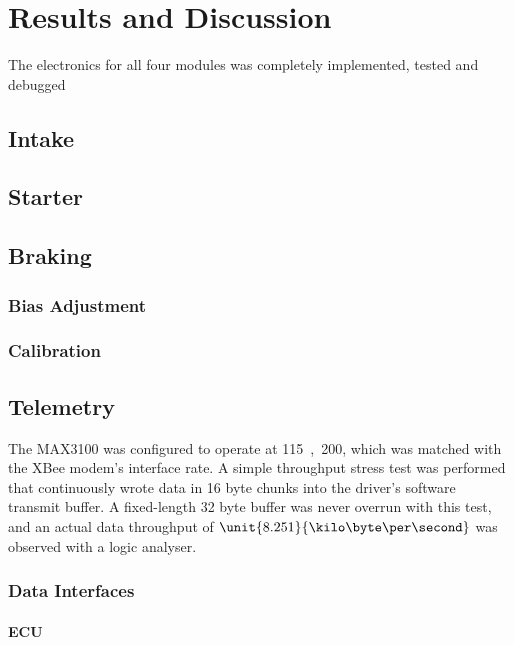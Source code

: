\chapter{Results and Discussion}

The electronics for all four modules was completely implemented, tested and debugged






\section{Intake}


\section{Starter}


\section{Braking}


\subsection{Bias Adjustment}


\subsection{Calibration}


\section{Telemetry}



The MAX3100 was configured to operate at \unit{115,200}{\kilo\bit\per\second}, which was matched with the XBee modem's interface rate. A simple throughput stress test was performed that continuously wrote data in 16 byte chunks into the driver's software transmit buffer. A fixed-length 32 byte buffer was never overrun with this test, and an actual data throughput of $\unit{8.251}{\kilo\byte\per\second}$ was observed with a logic analyser.

\subsection{Data Interfaces}


\subsubsection{ECU }


